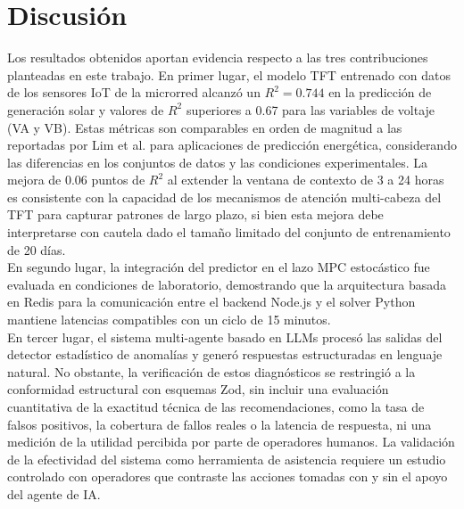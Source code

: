 \documentclass[journal,article,submit,pdftex,moreauthors]{Definitions/mdpi}
\begin{document}
\section{Discusi\'on}
Los resultados obtenidos aportan evidencia respecto a las tres contribuciones planteadas en este trabajo. En primer lugar, el modelo TFT entrenado con datos de los sensores IoT de la microrred alcanzó un $R^2 = 0.744$ en la predicción de generación solar y valores de $R^2$ superiores a 0.67 para las variables de voltaje (VA y VB). Estas métricas son comparables en orden de magnitud a las reportadas por Lim et al. \cite{ref-lim} para aplicaciones de predicción energética, considerando las diferencias en los conjuntos de datos y las condiciones experimentales. La mejora de 0.06 puntos de $R^2$ al extender la ventana de contexto de 3 a 24 horas es consistente con la capacidad de los mecanismos de atención multi-cabeza del TFT para capturar patrones de largo plazo, si bien esta mejora debe interpretarse con cautela dado el tamaño limitado del conjunto de entrenamiento de 20 días. 
\\
En segundo lugar, la integración del predictor en el lazo MPC estocástico fue evaluada en condiciones de laboratorio, demostrando que la arquitectura basada en Redis para la comunicación entre el backend Node.js y el solver Python mantiene latencias compatibles con un ciclo de 15 minutos. 
\\
En tercer lugar, el sistema multi-agente basado en LLMs procesó las salidas del detector estadístico de anomalías y generó respuestas estructuradas en lenguaje natural. No obstante, la verificación de estos diagnósticos se restringió a la conformidad estructural con esquemas Zod, sin incluir una evaluación cuantitativa de la exactitud técnica de las recomendaciones, como la tasa de falsos positivos, la cobertura de fallos reales o la latencia de respuesta, ni una medición de la utilidad percibida por parte de operadores humanos. La validación de la efectividad del sistema como herramienta de asistencia requiere un estudio controlado con operadores que contraste las acciones tomadas con y sin el apoyo del agente de IA.  
\\
\\
\end{document}
